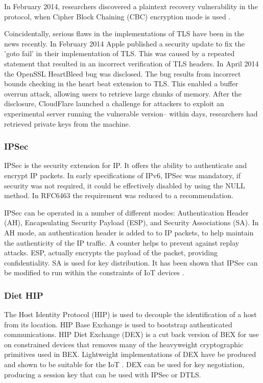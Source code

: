 \documentclass[10pt,journal,compsoc]{IEEEtran}
\begin{document}
In February 2014, researchers discovered a plaintext recovery vulnerability in
the protocol, when Cipher Block Chaining (CBC) encryption mode is used
\cite{AlFardan2012}. 

Coincidentally, serious flaws in the implementations of TLS have been in the
news recently. In February 2014 Apple published a security update to fix the
'goto fail' in their implementation of TLS.  This was caused by a repeated
statement that resulted in an incorrect verification of TLS headers. In April 2014
the OpenSSL HeartBleed bug was disclosed. The bug results from incorrect bounds
checking in the heart beat extension to TLS. This enabled a buffer overrun
attack, allowing users to retrieve large chunks of memory. After the
disclosure, CloudFlare launched a challenge for attackers to exploit an
experimental server running the vulnerable version-- within days, researchers
had retrieved private keys from the machine.

\subsubsection{IPSec}
IPSec is the security extension for IP. It offers the ability to authenticate
and encrypt IP packets. In early specifications of IPv6, IPSec was mandatory,
if security was not required, it could be effectively disabled by using the
NULL method. In RFC6463 the requirement was reduced to a recommendation. 

IPSec can be operated in a number of different modes: Authentication Header
(AH), Encapsulating Security Payload (ESP), and Security Associations (SA).  In
AH mode, an authentication header is added to to IP packets, to help maintain
the authenticity of the IP traffic. A counter helps to prevent against replay
attacks. ESP, actually encrypts the payload of the packet, providing
confidentiality. SA is used for key distribution. It has been shown that IPSec
can be modified to run within the constraints of IoT devices
\cite{Rubertis2013}.  

\subsubsection{Diet HIP}
The Host Identity Protocol (HIP) is used to decouple the identification of a
host from its location. HIP Base Exchange is used to bootstrap authenticated
communications. HIP Diet Exchange (DEX) is a cut back version of BEX for use on
constrained devices that removes many of the heavyweight cryptographic
primitives used in BEX.  Lightweight implementations of DEX have be produced
and shown to be suitable for the IoT \cite{Meca2013}. DEX can be used for
key negotiation, producing a session key that can be used with IPSec or DTLS. 
\end{document}
